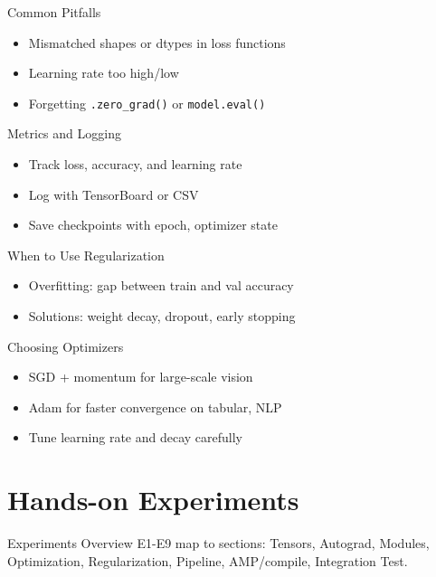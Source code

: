 \documentclass[aspectratio=169,10pt]{beamer}
\begin{document}
\begin{frame}{Common Pitfalls}
\begin{itemize}
    \item Mismatched shapes or dtypes in loss functions
    \item Learning rate too high/low
    \item Forgetting \texttt{.zero\_grad()} or \texttt{model.eval()}
\end{itemize}
\end{frame}

\begin{frame}{Metrics and Logging}
\begin{itemize}
    \item Track loss, accuracy, and learning rate
    \item Log with TensorBoard or CSV
    \item Save checkpoints with epoch, optimizer state
\end{itemize}
\end{frame}

\begin{frame}{When to Use Regularization}
\begin{itemize}
    \item Overfitting: gap between train and val accuracy
    \item Solutions: weight decay, dropout, early stopping
\end{itemize}
\end{frame}

\begin{frame}{Choosing Optimizers}
\begin{itemize}
    \item SGD + momentum for large-scale vision
    \item Adam for faster convergence on tabular, NLP
    \item Tune learning rate and decay carefully
\end{itemize}
\end{frame}

\section{Hands-on Experiments}

\begin{frame}{Experiments Overview}
E1-E9 map to sections: Tensors, Autograd, Modules, Optimization, Regularization, Pipeline, AMP/compile, Integration Test.
\end{frame}
\end{document}
